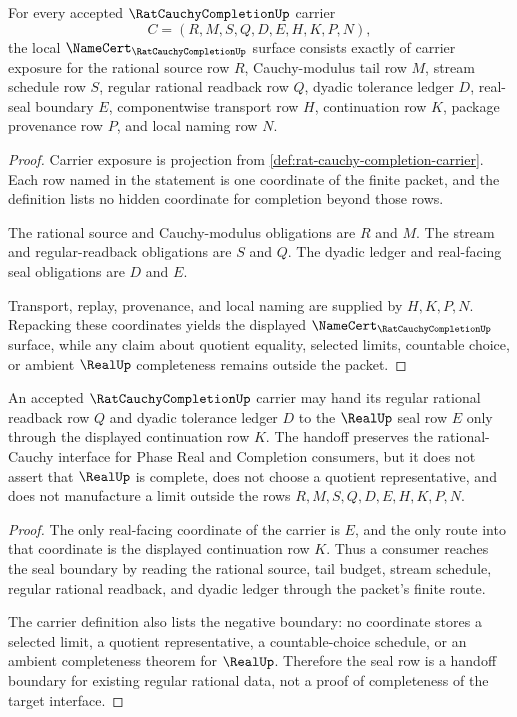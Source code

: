 \begin{theorem}
\label{thm:rat-cauchy-completion-namecert-obligations}
For every accepted $\RatCauchyCompletionUp$ carrier
$$
C=(R,M,S,Q,D,E,H,K,P,N),
$$
the local $\NameCert_{\RatCauchyCompletionUp}$ surface consists exactly of carrier exposure for the rational source row $R$, Cauchy-modulus tail row $M$, stream schedule row $S$, regular rational readback row $Q$, dyadic tolerance ledger $D$, real-seal boundary $E$, componentwise transport row $H$, continuation row $K$, package provenance row $P$, and local naming row $N$.
\end{theorem}
\begin{proof}
Carrier exposure is projection from \autoref{def:rat-cauchy-completion-carrier}. Each row named in the statement is one coordinate of the finite packet, and the definition lists no hidden coordinate for completion beyond those rows.

The rational source and Cauchy-modulus obligations are $R$ and $M$. The stream and regular-readback obligations are $S$ and $Q$. The dyadic ledger and real-facing seal obligations are $D$ and $E$.

Transport, replay, provenance, and local naming are supplied by $H,K,P,N$. Repacking these coordinates yields the displayed $\NameCert_{\RatCauchyCompletionUp}$ surface, while any claim about quotient equality, selected limits, countable choice, or ambient $\RealUp$ completeness remains outside the packet.
\end{proof}

\begin{theorem}
\label{thm:rat-cauchy-completion-real-seal-boundary}
An accepted $\RatCauchyCompletionUp$ carrier may hand its regular rational readback row $Q$ and dyadic tolerance ledger $D$ to the $\RealUp$ seal row $E$ only through the displayed continuation row $K$. The handoff preserves the rational-Cauchy interface for Phase Real and Completion consumers, but it does not assert that $\RealUp$ is complete, does not choose a quotient representative, and does not manufacture a limit outside the rows $R,M,S,Q,D,E,H,K,P,N$.
\end{theorem}
\begin{proof}
The only real-facing coordinate of the carrier is $E$, and the only route into that coordinate is the displayed continuation row $K$. Thus a consumer reaches the seal boundary by reading the rational source, tail budget, stream schedule, regular rational readback, and dyadic ledger through the packet's finite route.

The carrier definition also lists the negative boundary: no coordinate stores a selected limit, a quotient representative, a countable-choice schedule, or an ambient completeness theorem for $\RealUp$. Therefore the seal row is a handoff boundary for existing regular rational data, not a proof of completeness of the target interface.
\end{proof}

